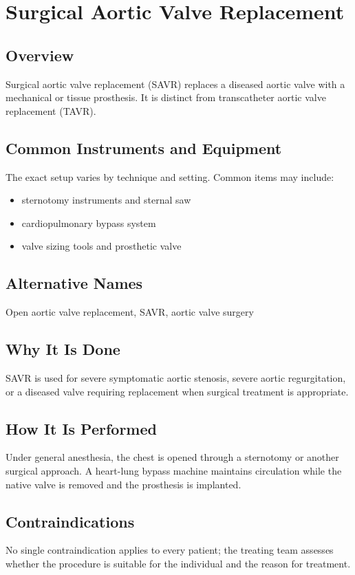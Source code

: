 \chapter{Surgical Aortic Valve Replacement}

\section*{Overview}
Surgical aortic valve replacement (SAVR) replaces a diseased aortic valve with a mechanical or tissue prosthesis. It is distinct from transcatheter aortic valve replacement (TAVR).

\section*{Common Instruments and Equipment}
The exact setup varies by technique and setting. Common items may include:
\begin{itemize}[nosep,leftmargin=*]
  \item sternotomy instruments and sternal saw
  \item cardiopulmonary bypass system
  \item valve sizing tools and prosthetic valve
\end{itemize}

\section*{Alternative Names}
Open aortic valve replacement, SAVR, aortic valve surgery

\section*{Why It Is Done}
SAVR is used for severe symptomatic aortic stenosis, severe aortic regurgitation, or a diseased valve requiring replacement when surgical treatment is appropriate.

\section*{How It Is Performed}
Under general anesthesia, the chest is opened through a sternotomy or another surgical approach. A heart-lung bypass machine maintains circulation while the native valve is removed and the prosthesis is implanted.

\section*{Contraindications}
No single contraindication applies to every patient; the treating team assesses whether the procedure is suitable for the individual and the reason for treatment.

